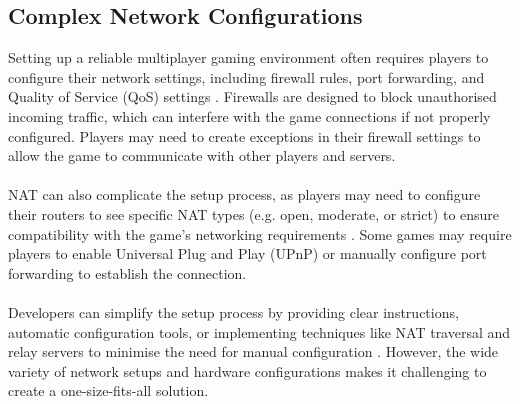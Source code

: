 \subsection{Complex Network Configurations}
Setting up a reliable multiplayer gaming environment often requires players to configure their network settings, including firewall rules, port forwarding, and Quality of Service (QoS) settings \cite{develop-unity}. Firewalls are designed to block unauthorised incoming traffic, which can interfere with the game connections if not properly configured. Players may need to create exceptions in their firewall settings to allow the game to communicate with other players and servers.
\\
\noindent
\\
NAT can also complicate the setup process, as players may need to configure their routers to see specific NAT types (e.g. open, moderate, or strict) to ensure compatibility with the game's networking requirements \cite{port-forwarding}. Some games may require players to enable Universal Plug and Play (UPnP) or manually configure port forwarding to establish the connection.
\\
\noindent
\\
Developers can simplify the setup process by providing clear instructions, automatic configuration tools, or implementing techniques like NAT traversal and relay servers to minimise the need for manual configuration \cite{network-architecting}. However, the wide variety of network setups and hardware configurations makes it challenging to create a one-size-fits-all solution.

